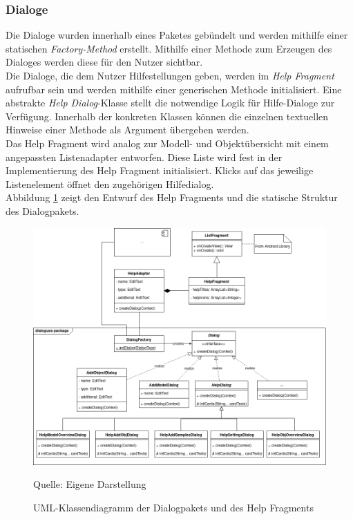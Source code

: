 \documentclass[oneside]{ausarbeitung}
\begin{document}
\subsubsection{Dialoge}
Die Dialoge wurden innerhalb eines Paketes gebündelt und werden mithilfe einer statischen \textit{Factory-Method} erstellt. Mithilfe einer Methode zum Erzeugen des Dialoges werden diese für den Nutzer sichtbar.\\
Die Dialoge, die dem Nutzer Hilfestellungen geben, werden im \textit{Help Fragment} aufrufbar sein und werden mithilfe einer generischen Methode initialisiert. Eine abstrakte \textit{Help Dialog}-Klasse stellt die notwendige Logik für Hilfe-Dialoge zur Verfügung. Innerhalb der konkreten Klassen können die einzelnen textuellen Hinweise einer Methode als Argument übergeben werden. \\
Das Help Fragment wird analog zur Modell- und Objektübersicht mit einem angepassten Listenadapter entworfen. Diese Liste wird fest in der Implementierung des Help Fragment initialisiert. Klicks auf das jeweilige Listenelement öffnet den zugehörigen Hilfedialog.\\
Abbildung \ref{fig:dialogues} zeigt den Entwurf des Help Fragments und die statische Struktur des Dialogpakets.
\begin{figure}[hptb]
	\centering
	\includegraphics[height=0.6\textheight]{images/dialogues.png}
	\caption{UML-Klassendiagramm der Dialogpakets und des Help Fragments} Quelle: Eigene Darstellung
	\label{fig:dialogues}
\end{figure}
\end{document}
